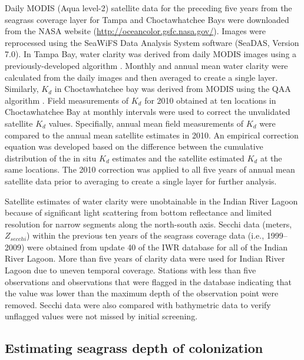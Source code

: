 \documentclass[letterpaper,12pt,oneside]{article}\usepackage[]{graphicx}\usepackage[]{color}
\begin{document}
Daily MODIS (Aqua level-2) satellite data for the preceding five years from the seagrass coverage layer for Tampa and Choctawhatchee Bays were downloaded from the NASA website (\url{http://oceancolor.gsfc.nasa.gov/}). Images were reprocessed using the SeaWiFS Data Analysis System software (SeaDAS, Version 7.0). In Tampa Bay, water clarity was derived from daily MODIS images using a previously-developed algorithm \citep{Chen07}. Monthly and annual mean water clarity were calculated from the daily images and then averaged to create a single layer. Similarly, $K_d$ in Choctawhatchee bay was derived from MODIS using the QAA algorithm \citep{Lee05}.  Field measurements of $K_d$ for 2010 obtained at ten locations in Choctawhatchee Bay at monthly intervals were used to correct the unvalidated satellite $K_d$ values.  Specifially, annual mean field measurements of $K_d$ were compared to the annual mean satellite estimates in 2010.  An empirical correction equation was developed based on the difference between the cumulative distribution of the in situ $K_d$ estimates and the satellite estimated $K_d$ at the same locations.  The 2010 correction was applied to all five years of annual mean satellite data prior to averaging to create a single layer for further analysis.

Satellite estimates of water clarity were unobtainable in the Indian River Lagoon because of significant light scattering from bottom reflectance and limited resolution for narrow segments along the north-south axis.  Secchi data (meters, $Z_{secchi}$) within the previous ten years of the seagrass coverage data (i.e., 1999--2009) were obtained from update 40 of the \ac{IWR} database for all of the Indian River Lagoon.  More than five years of clarity data were used for Indian River Lagoon due to uneven temporal coverage.  Stations with less than five observations and observations that were flagged in the database indicating that the value was lower than the maximum depth of the observation point were removed.  Secchi data were also compared with bathymetric data to verify unflagged values were not missed by initial screening. 

\subsection{Estimating seagrass depth of colonization} \label{sec:est_method}
\end{document}
